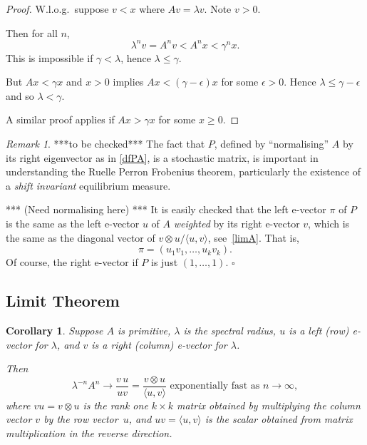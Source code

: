 \documentclass[a4paper]{amsart}
\theoremstyle{plain}
\newtheorem{corollary}[theorem]{Corollary}
\theoremstyle{definition}
\theoremstyle{remark}
\newtheorem{remark}[theorem]{Remark}
\begin{document}
\begin{proof}
 W.l.o.g.\ suppose $ v<x $ where $ Av = \lambda v $.  Note $ v>0$.
 
 Then for all $ n $, 
 \[
 \lambda ^n v = A^n v < A^n x < \gamma ^n x.
 \]
 This is impossible if $ \gamma < \lambda $, hence $ \lambda \leq \gamma $.
 
 But $ Ax < \gamma x $ and $ x>0 $ implies $ Ax < (\gamma- \epsilon) x $ for some $ \epsilon > 0 $.
 Hence $ \lambda \leq \gamma - \epsilon  $ and so $ \lambda < \gamma $.   
 
  A similar proof applies if $ Ax > \gamma x $ for some $ x \geq 0 $.
 \end{proof} 


\begin{remark}
***to be checked***  The fact that $ P $, defined by ``normalising'' $ A $  by its right eigenvector as in \eqref{dfPA}, is a stochastic matrix, is 
important in understanding the Ruelle Perron Frobenius theorem, particularly the existence of a \emph{shift invariant} equilibrium measure.  

*** (Need normalising here) *** It is easily checked that the left e-vector $ \pi $ of $  P $ is the same as the left e-vector $ u $ of $ A $ \emph{weighted} by its right e-vector $ v $, which is the same as the diagonal vector of $v\otimes u/\langle u,v \rangle  $, see~\eqref{limA}.   That is,
\[
\pi = (u_1v_1,\dots, u_kv_k) .
\]
Of course, the right e-vector if $ P $ is just $ (1,\dots, 1) $.
\hfill $\square$  \end{remark} 


\subsection{Limit Theorem}
\begin{corollary}\label{corlt}
  Suppose $ A $ is primitive, $  \lambda  $ is the spectral radius, $ u  $ is a
 left (row) e-vector for $ \lambda   $, and $ v $ is a right (column) e-vector for $ \lambda   $.

Then 
\begin{equation} \label{limA} 
  \lambda ^{-n}A^n \to \frac{v\, u }{u  v}  = \frac{v \otimes u}{  \langle u , v \rangle }  \text{ exponentially fast as } n\to \infty ,
\end{equation} 
  where $ v  u  = v\otimes u $ is the rank one $ k \times k $ matrix obtained by multiplying the column vector  $v  $ by the row vector~$ u$, and $ uv = \langle u , v \rangle $ is the scalar obtained from matrix multiplication in the reverse direction.
\end{corollary}
\end{document}
